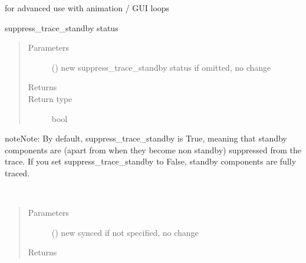 \documentclass[letterpaper,10pt,english]{sphinxmanual}
\begin{document}
\begin{fulllineitems}
\begin{fulllineitems}
for advanced use with animation / GUI loops

\end{fulllineitems}


\begin{fulllineitems}
\label{\detokenize{Reference:salabim.Environment.suppress_trace_standby}}
suppress\_trace\_standby status
\begin{quote}\begin{description}
\item[{Parameters}] \leavevmode
{} () \textendash{} new suppress\_trace\_standby status 
if omitted, no change

\item[{Returns}] \leavevmode
{}

\item[{Return type}] \leavevmode
bool

\end{description}\end{quote}

\begin{sphinxadmonition}{note}{Note:}
By default, suppress\_trace\_standby is True, meaning that standby components are
(apart from when they become non standby) suppressed from the trace. 
If you set suppress\_trace\_standby to False, standby components are fully traced.
\end{sphinxadmonition}

\end{fulllineitems}


\begin{fulllineitems}
\label{\detokenize{Reference:salabim.Environment.synced}}~\begin{quote}\begin{description}
\item[{Parameters}] \leavevmode
{} () \textendash{} new synced 
if not specified, no change

\item[{Returns}] \leavevmode
{}


\end{description}
\end{quote}
\end{fulllineitems}
\end{fulllineitems}
\end{document}
